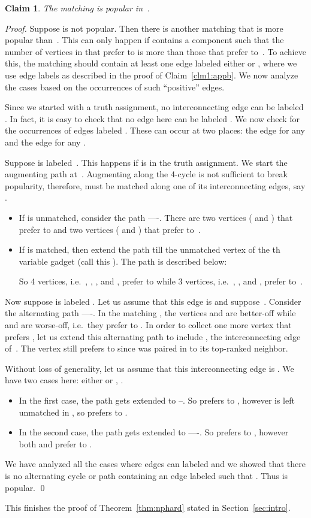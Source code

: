 \documentclass[11pt]{llncs}
\newtheorem{new-claim}{Claim}
\begin{document}
\begin{new-claim}
\label{clm2:appb}
The matching  is popular in~.
\end{new-claim}
\begin{proof}
Suppose  is not popular. Then there is another matching  that is more popular than~. This can only happen if  contains 
a component  such that the number of vertices in  that prefer  to  is more than those that prefer  to~.
To achieve this, the matching  should contain at least one edge labeled either  or , where we use edge labels 
as described in the proof of Claim~\ref{clm1:appb}. We now analyze the cases based on the occurrences of such ``positive'' edges.

Since we started with a truth assignment, no interconnecting edge can be labeled . In fact, it is easy to check that no edge here can 
be labeled . We now check for the occurrences of edges labeled . These can occur at two places: the edge  
for any  and the edge  for any . 

 Suppose  is labeled~. This happens if  is  in the truth assignment.
We start the augmenting path  at~. Augmenting along the 4-cycle is not sufficient to break popularity, therefore,  must 
be matched along one of its interconnecting edges, say . 
\begin{itemize}
\item If  is unmatched, consider the path ----. There are two vertices ( and ) 
that prefer  to  and two vertices ( and ) that prefer  to~.
\item If  is matched, then extend the path  till the unmatched vertex of the th variable gadget (call this ). The path
 is described below:

So 4 vertices, i.e.\ , , , and , prefer
 to  while 3 vertices, i.e.\ , , and , prefer  to~.
\end{itemize}



Now suppose  is labeled . Let us assume that this edge is  and suppose~. 
Consider the alternating path ----. In the matching , the vertices  and
 are better-off while  and  are worse-off, i.e.\ they prefer  to  . In order to collect one
more vertex that prefers , let us extend this alternating path  to include  , the interconnecting edge 
of~. The vertex  still prefers  to  since  was paired in  to its top-ranked neighbor.

Without loss of generality, let us assume that this interconnecting edge is . 
We have two cases here: either  or , . 
\begin{itemize}
\item In the first case, the path  gets extended to --. So  prefers  to , however
 is left unmatched in , so  prefers  to .
\item In the second case, the path  gets extended to ----. So  prefers  
to , however both  and  prefer  to .
\end{itemize}
We have analyzed all the cases where edges can labeled  and we showed that there is no alternating cycle or path  containing an edge
labeled  such that . Thus  is popular. \qed
\end{proof}
This finishes the proof of Theorem~\ref{thm:nphard} stated in Section~\ref{sec:intro}.
\end{document}
